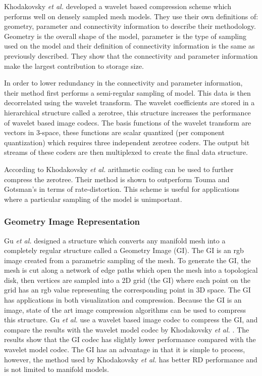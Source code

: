 Khodakovsky \textit{et al.} \cite{Khodakovsky00Progressive} developed a wavelet based compression scheme which performs well on densely sampled mesh models. They use their own definitions of: geometry, parameter and connectivity information to describe their methodology. Geometry is the overall shape of the model, parameter is the type of sampling used on the model and their definition of connectivity information is the same as previously described. They show that the connectivity and parameter information make the largest contribution to storage size.

In order to lower redundancy in the connectivity and parameter information, their method first performs a semi-regular sampling of model. This data is then decorrelated using the wavelet transform. The wavelet coefficients are stored in a hierarchical structure called a zerotree, this structure increases the performance of wavelet based image codecs. The basis functions of the wavelet transform are vectors in 3-space, these functions are scalar quantized (per component quantization) which requires three independent zerotree coders. The output bit streams of these coders are then multiplexed to create the final data structure. 

According to Khodakovsky \textit{et al.} arithmetic coding can be used to further compress the zerotree. Their method is shown to outperform Touma and Gotsman's in terms of rate-distortion. This scheme is useful for applications where a particular sampling of the model is unimportant.

\subsubsection{Geometry Image Representation}

Gu \textit{et al.} \cite{Gu02Geometry} designed a structure which converts any manifold mesh into a completely regular structure called a Geometry Image (GI). The GI is an rgb image created from a parametric sampling of the mesh. To generate the GI, the mesh is cut along a network of edge paths which open the mesh into a topological disk, then vertices are sampled into a 2D grid (the GI) where each point on the grid has an rgb value representing the corresponding point in 3D space. The GI has applications in both visualization and compression. Because the GI is an image, state of the art image compression algorithms can be used to compress this structure. Gu \textit{et al.} use a wavelet based image codec to compress the GI, and compare the results with the wavelet model codec by Khodakovsky \textit{et al.} \cite{Khodakovsky00Progressive}. The results show that the GI codec has slightly lower performance compared with the wavelet model codec. The GI has an advantage in that it is simple to process, however, the method used by Khodakovsky \textit{et al.} has better RD performance and is not limited to manifold models.


